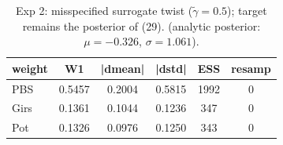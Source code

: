 \begin{table}[ht]
\centering
\caption{Exp 2: misspecified surrogate twist ($\tilde\gamma = 0.5$); target remains the posterior of (29). (analytic posterior: $\mu=-0.326$, $\sigma=1.061$).}
\label{tab:toy_2}
\begin{tabular}{lccccc}
\toprule
weight & W1 & |dmean| & |dstd| & ESS & resamp \\
\midrule
PBS & 0.5457 & 0.2004 & 0.5815 & 1992 & 0 \\
Girs & 0.1361 & 0.1044 & 0.1236 & 347 & 0 \\
Pot & 0.1326 & 0.0976 & 0.1250 & 343 & 0 \\
\bottomrule
\end{tabular}
\end{table}
